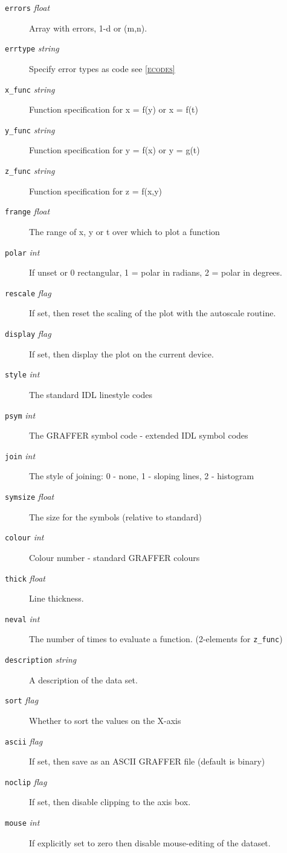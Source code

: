 \documentclass[11pt,twoside,english]{article}
\begin{document}
\begin{description}
\item[\texttt{errors} \textit{float}] Array with errors, 1-d or (m,n).
\item[\texttt{errtype} \textit{string}] Specify error types as code see
  \textsc{\autoref{ecodes}}
\item[\texttt{x\_func} \textit{string}] Function specification for x =
  f(y) or x = f(t)
\item[\texttt{y\_func} \textit{string}] Function specification for y =
  f(x) or y = g(t)
\item[\texttt{z\_func} \textit{string}] Function specification for z =
  f(x,y)
\item[\texttt{frange} \textit{float}] The range of x, y or t over which
  to plot a function
\item[\texttt{polar} \textit{int}] If unset or 0 rectangular, 1 = polar
  in radians, 2 = polar in degrees.
\item[\texttt{rescale} \textit{flag}] If set, then reset the scaling of
  the plot with the autoscale routine.
\item[\texttt{display} \textit{flag}] If set, then display the plot on
  the current device.
\item[\texttt{style} \textit{int}] The standard IDL linestyle codes
\item[\texttt{psym} \textit{int}] The GRAFFER symbol code - extended
  IDL symbol codes
\item[\texttt{join} \textit{int}] The style of joining: 0 - none, 1 -
  sloping lines, 2 - histogram
\item[\texttt{symsize} \textit{float}] The size for the symbols
  (relative to standard)
\item[\texttt{colour} \textit{int}] Colour number - standard GRAFFER
  colours
\item[\texttt{thick} \textit{float}] Line thickness.
\item[\texttt{neval} \textit{int}] The number of times to evaluate a
  function. (2-elements for \texttt{z\_func})
\item[\texttt{description} \textit{string}] A description of the data
  set.
\item[\texttt{sort} \textit{flag}] Whether to sort the values on the
  X-axis
\item[\texttt{ascii} \textit{flag}] If set, then save as an ASCII
  GRAFFER file (default is binary)
\item[\texttt{noclip} \textit{flag}] If set, then disable clipping to
  the axis box.
\item[\texttt{mouse} \textit{int}] If explicitly set to zero then
  disable mouse-editing of the dataset.


\end{description}
\end{document}
